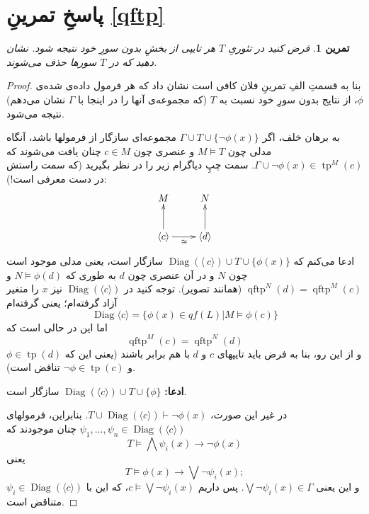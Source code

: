\documentclass[12pt,a4paper]{report}
\theoremstyle{colorhead}
\newtheorem{tam}{تمرین}
\DeclareMathOperator{\diag}{Diag}
\DeclareMathOperator{\qftp}{qftp}
\DeclareMathOperator{\tp}{tp}
\begin{document}
\section*{پاسخِ تمرینِ 
\ref{qftp}}
\begin{tam}
فرض کنید در تئوریِ 
$T$
هر تایپی از بخشِ بدون سورِ خود نتیجه شود. نشان دهید که در 
$T$
سورها حذف می‌شوند.
\end{tam}
\begin{proof}
بنا به قسمتِ الفِ تمرینِ
فلان
کافی است نشان داد که هر فرمول داده‌ی شده‌ی
$\phi$،
 از نتایج بدون سورِ خود نسبت به
$T$
(که مجموعه‌ی آنها را در اینجا با
$\Gamma$
نشان می‌دهم)
نتیجه می‌شود. 
\par 
به برهان خلف، اگر
$\Gamma\cup T\cup \{\neg \phi(x)\}$
مجموعه‌ای سازگار از فرمولها باشد، آنگاه مدلی چون
$M\models T$
و عنصری چون
$c\in M$
چنان یافت می‌شوند که
$\Gamma\cup \neg\phi(x)\in \tp^M(c)$.
سمت چپِ دیاگرام زیر را در نظر بگیرید (که سمت راستش در دست معرفی است!):
\[
\xymatrix{
M & N \\
\langle c\rangle \ar[u] \ar[r]_\cong &\langle d\rangle \ar[u]
}
\]
ادعا می‌کنم که
$\diag(\langle\ c\rangle)\cup T\cup \{\phi(x)\}$
سازگار است، یعنی مدلی موجود است چون
$N$
 و در آن عنصری چون
 $d$
 به طوری که
 $N\models \phi(d)$
 و 
 $\qftp^N(d)=\qftp^M(c)$
 (همانند تصویر). توجه کنید در 
 $\diag(\langle c\rangle)$
 نیز
 $x$
 را متغیر آزاد گرفته‌ام؛ یعنی گرفته‌ام
 \[
 \diag \langle c\rangle=\{\phi(x)\in qf(L)|M\models \phi(c) \}
 \]
 اما این در حالی است که 
 \[
\qftp^M(c)=\qftp^N(d)
 \]
 و از این رو، بنا به فرض باید تایپهای 
 $c$
 و
 $d$
 با هم برابر باشند (یعنی این که
 $\phi\in \tp(d)$
 و
 $\neg \phi\in \tp(c)$
 تناقض است).
 \par 
 \textbf{ادعا: }
 $\diag (\langle c\rangle)\cup T\cup \{\phi\}$
 سازگار است.
 \par 
 در غیر این صورت، 
 $T\cup \diag (\langle c\rangle)\vdash \neg \phi(x)$.
 بنابراین، فرمولهای
 $\psi_1,\ldots,\psi_n\in \diag (\langle c\rangle)$
چنان موجودند که 
\[
T\models \bigwedge \psi_i(x)\to \neg \phi(x)
\]
یعنی
\[
T\models \phi(x)\to \bigvee \neg \psi_i(x);
\]
و این یعنی
$\bigvee \neg \psi_i(x)\in \Gamma$.
پس داریم
$c\models \bigvee \neg \psi_i(x)$،
که این با
$\psi_i\in \diag(\langle c\rangle)$
متناقض است. 
\end{proof}
\pagebreak 
\end{document}
